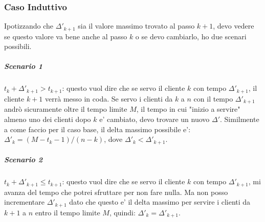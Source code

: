 \documentclass{article}
\begin{document}
                \subsubsection{Caso Induttivo}
                    Ipotizzando che $\Delta'_{k+1}$ sia il valore massimo trovato al passo $k+1$, devo vedere se questo valore va bene anche al passo $k$ o se devo cambiarlo, ho due scenari possibili.
                    \subparagraph{Scenario 1}
                        $t_{k} + \Delta'_{k+1} > t_{k+1}$: questo vuol dire che se servo il cliente $k$ con tempo $\Delta'_{k+1}$, il cliente $k+1$ verrà messo in coda. Se servo i clienti da $k$ a $n$ con il tempo $\Delta'_{k+1}$ andrò sicuramente oltre il tempo limite $M$, il tempo in cui "inizio a servire" almeno uno dei clienti dopo $k$ e' cambiato, devo trovare un nuovo $\Delta'$. Similmente a come faccio per il caso base, il delta massimo possibile e': $\Delta'_{k} = (M-t_{k} -1) / (n-k)$, dove $\Delta'_{k} < \Delta'_{k+1}$.
                    \subparagraph{Scenario 2}
                        $t_{k} + \Delta'_{k+1} \leq t_{k+1}$: questo vuol dire che se servo il cliente $k$ con tempo $\Delta'_{k+1}$, mi avanza del tempo che potrei sfruttare per non fare nulla. Ma non posso incrementare $\Delta'_{k+1}$ dato che questo e' il delta massimo per servire i clienti da $k+1$ a $n$ entro il tempo limite $M$, quindi: $\Delta'_{k} = \Delta'_{k+1}$.
\end{document}
